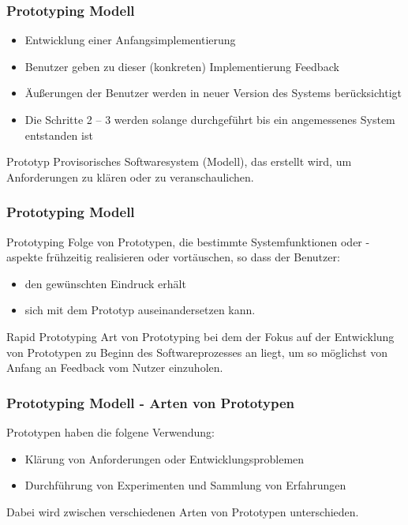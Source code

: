\begin{frame}
\frametitle{Prototyping Modell}
	\begin{itemize}
		\item Entwicklung einer Anfangsimplementierung
		\item Benutzer geben zu dieser (konkreten) Implementierung Feedback
		\item Äußerungen der Benutzer werden in neuer Version des Systems berücksichtigt
		\item Die Schritte 2 – 3 werden solange durchgeführt bis ein angemessenes System entstanden ist
	\end{itemize}
	\begin{block}{Prototyp}
		Provisorisches Softwaresystem (Modell), das erstellt wird, 
		um Anforderungen zu klären oder zu veranschaulichen.
	\end{block}
\end{frame}

\begin{frame}
\frametitle{Prototyping Modell}
	\begin{block}{Prototyping}
		Folge von Prototypen, die bestimmte Systemfunktionen oder -aspekte
		frühzeitig realisieren oder vortäuschen, so dass der Benutzer:
		\begin{itemize}
			\item den gewünschten Eindruck erhält
			\item sich mit dem Prototyp auseinandersetzen kann.
		\end{itemize}
	\end{block}
	\begin{block}{Rapid Prototyping}
		Art von Prototyping bei dem der Fokus auf der Entwicklung 
		von Prototypen zu Beginn des Softwareprozesses an liegt, 
		um so möglichst von Anfang an Feedback vom Nutzer einzuholen. 
	\end{block}
\end{frame}

\begin{frame}
\frametitle{Prototyping Modell - Arten von Prototypen}
	Prototypen haben die folgene Verwendung:
	\begin{itemize}
		\item Klärung von Anforderungen oder Entwicklungsproblemen
		\item Durchführung von Experimenten und Sammlung von Erfahrungen
	\end{itemize}
	\bigskip
	Dabei wird zwischen verschiedenen Arten von Prototypen unterschieden.
\end{frame}

